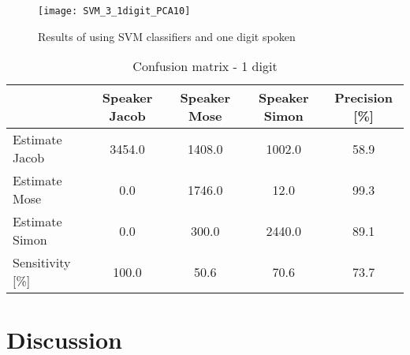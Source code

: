 \begin{figure}[H]
\centering
\texttt{[image: SVM\_3\_1digit\_PCA10]}
\caption{Results of using SVM classifiers and one digit spoken}
\label{fig:SVM3_1dig_PCA}
\end{figure}

\begin{table}[H]                                                    
\centering                                                          
\begin{tabular}{|l|c|c|c|c|}                                        
\hline                                                              
  & Speaker Jacob & Speaker Mose & Speaker Simon & Precision [\%] \\
\hline                                                              
Estimate Jacob & 3454.0 & 1408.0 & 1002.0 & 58.9 \\                 
\hline                                                              
Estimate Mose & 0.0 & 1746.0 & 12.0 & 99.3 \\                       
\hline                                                              
Estimate Simon & 0.0 & 300.0 & 2440.0 & 89.1 \\                     
\hline                                                              
Sensitivity [\%] & 100.0 & 50.6 & 70.6 & 73.7 \\                    
\hline                                                              
\end{tabular}                                                       
\caption{Confusion matrix - 1 digit}                                
\label{table:SVM_3_conf_1}                                          
\end{table} 


\section{Discussion}